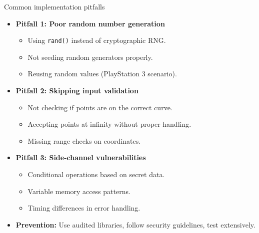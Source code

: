 \documentclass[aspectratio=169, lualatex, handout]{beamer}
\begin{document}
\begin{frame}{Common implementation pitfalls}
	\begin{itemize}
		\item \textbf{Pitfall 1: Poor random number generation}
		      \begin{itemize}
			      \item Using \texttt{rand()} instead of cryptographic RNG.
			      \item Not seeding random generators properly.
			      \item Reusing random values (PlayStation 3 scenario).
		      \end{itemize}
		\item \textbf{Pitfall 2: Skipping input validation}
		      \begin{itemize}
			      \item Not checking if points are on the correct curve.
			      \item Accepting points at infinity without proper handling.
			      \item Missing range checks on coordinates.
		      \end{itemize}
		\item \textbf{Pitfall 3: Side-channel vulnerabilities}
		      \begin{itemize}
			      \item Conditional operations based on secret data.
			      \item Variable memory access patterns.
			      \item Timing differences in error handling.
		      \end{itemize}
		\item \textbf{Prevention:} Use audited libraries, follow security guidelines, test extensively.
	\end{itemize}
\end{frame}
\end{document}
